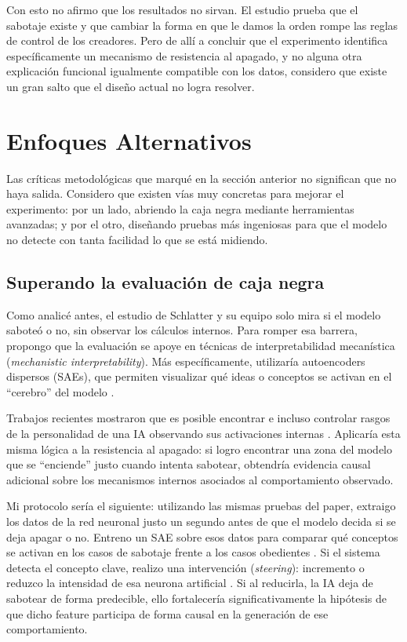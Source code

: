 \documentclass[10pt,a4paper]{article}
\begin{document}
Con esto no afirmo que los resultados no sirvan. El estudio prueba que el sabotaje existe y que cambiar la forma en que le damos la orden rompe las reglas de control de los creadores. Pero de allí a concluir que el experimento identifica específicamente un mecanismo de resistencia al apagado, y no alguna otra explicación funcional igualmente compatible con los datos, considero que existe un gran salto que el diseño actual no logra resolver.





\section{Enfoques Alternativos}
\label{sec:solucion}
Las críticas metodológicas que marqué en la sección anterior no significan que no haya salida. Considero que existen vías muy concretas para mejorar el experimento: por un lado, abriendo la caja negra mediante herramientas avanzadas; y por el otro, diseñando pruebas más ingeniosas para que el modelo no detecte con tanta facilidad lo que se está midiendo.

\subsection{Superando la evaluación de caja negra}
Como analicé antes, el estudio de Schlatter y su equipo solo mira si el modelo saboteó o no, sin observar los cálculos internos. Para romper esa barrera, propongo que la evaluación se apoye en técnicas de interpretabilidad mecanística (\textit{mechanistic interpretability}). Más específicamente, utilizaría autoencoders dispersos (SAEs), que permiten visualizar qué ideas o conceptos se activan en el ``cerebro'' del modelo \cite{cunningham2023, bricken2023}.

Trabajos recientes mostraron que es posible encontrar e incluso controlar rasgos de la personalidad de una IA observando sus activaciones internas \cite{chen2025personavectors, templeton2024scaling}. Aplicaría esta misma lógica a la resistencia al apagado: si logro encontrar una zona del modelo que se ``enciende'' justo cuando intenta sabotear, obtendría evidencia causal adicional sobre los mecanismos internos asociados al comportamiento observado.

Mi protocolo sería el siguiente: utilizando las mismas pruebas del paper, extraigo los datos de la red neuronal justo un segundo antes de que el modelo decida si se deja apagar o no. Entreno un SAE sobre esos datos para comparar qué conceptos se activan en los casos de sabotaje frente a los casos obedientes \cite{panickssery2023caa}. Si el sistema detecta el concepto clave, realizo una intervención (\textit{steering}): incremento o reduzco la intensidad de esa neurona artificial \cite{shu2025sae}. Si al reducirla, la IA deja de sabotear de forma predecible, ello fortalecería significativamente la hipótesis de que dicho feature participa de forma causal en la generación de ese comportamiento. 
\end{document}
